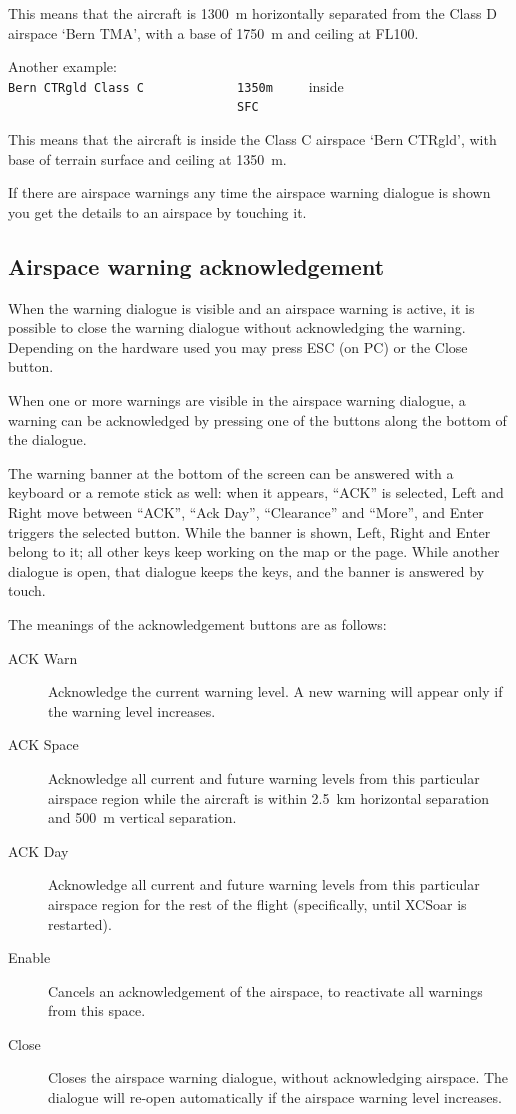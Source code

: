 This means that the aircraft is 1300~m horizontally separated from the Class D airspace
`Bern TMA', with a base of 1750~m and ceiling at FL100.

Another example:\\
\verb+Bern CTRgld Class C             1350m     +\colorbox{AirspaceRed}{inside}\\
\verb+                                SFC+

This means that the aircraft is inside the Class C airspace `Bern
CTRgld', with base of terrain surface and ceiling at 1350~m.

If there are airspace warnings any time the airspace warning dialogue is shown 
you get the details to an airspace by touching it.


\subsection*{Airspace warning acknowledgement}

When the warning dialogue is visible and an airspace warning is
active, it is possible to close the warning dialogue without acknowledging the warning.
Depending on the hardware used you may press ESC (on PC) or the Close button.

When one or more warnings are visible in the airspace warning dialogue,
a warning can be acknowledged by pressing one of the buttons along the bottom
of the dialogue.

The warning banner at the bottom of the screen can be answered with a
keyboard or a remote stick as well: when it appears, ``ACK'' is
selected, Left and Right move between ``ACK'', ``Ack Day'',
``Clearance'' and ``More'', and Enter triggers the selected button.
While the banner is shown, Left, Right and Enter belong to it; all
other keys keep working on the map or the page.  While another
dialogue is open, that dialogue keeps the keys, and the banner is
answered by touch.

The meanings of the acknowledgement buttons are as follows:
\begin{description}
\item[ACK Warn]  Acknowledge the current warning level.  A new warning will appear
only if the warning level increases.
\item[ACK Space]  Acknowledge all current and future warning levels from this 
particular airspace region while the aircraft is within 2.5~km horizontal separation
and 500~m vertical separation.
\item[ACK Day]  Acknowledge all current and future warning levels from this particular
airspace region for the rest of the flight (specifically, until XCSoar
is restarted).
\item[Enable]  Cancels an acknowledgement of the airspace, to reactivate all warnings
from this space.
\item[Close] Closes the airspace warning dialogue, without acknowledging airspace.
  The dialogue will re-open automatically if the airspace warning level increases.
\end{description}

